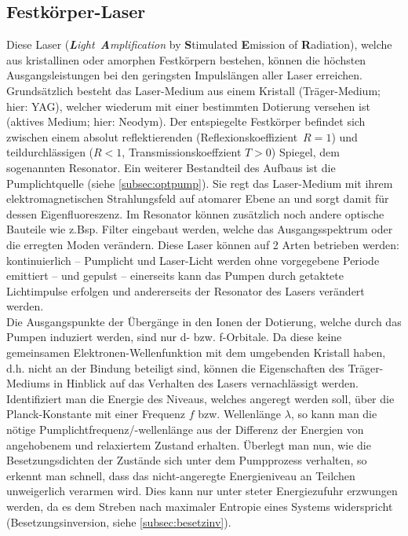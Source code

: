 \documentclass[numbers=noenddot,12pt,a4paper]{scrartcl}
\newcommand{\tilt}[1]{\mbox{\textit{#1}}}
\begin{document}
\subsection{Festkörper-Laser}\label{subsec:fklaser}
Diese Laser (\tilt{\textbf{L}ight \textbf{A}mplification} by \textbf{S}timulated \textbf{E}mission of \textbf{R}adiation), welche aus kristallinen oder amorphen Festkörpern bestehen, können die höchsten Ausgangsleistungen bei den geringsten Impulslängen aller Laser erreichen. Grundsätzlich besteht das Laser-Medium aus einem Kristall (Träger-Medium; hier: YAG), welcher wiederum mit einer bestimmten Dotierung versehen ist (aktives Medium; hier: Neodym). Der entspiegelte Festkörper befindet sich zwischen einem absolut reflektierenden \mbox{(Reflexionskoeffizient $R=1$)} und teildurchlässigen ($R<1$, Transmissionskoeffzient $T>0$) Spiegel, dem sogenannten Resonator. Ein weiterer Bestandteil des Aufbaus ist die Pumplichtquelle (siehe \ref{subsec:optpump}). Sie regt das Laser-Medium mit ihrem elektromagnetischen Strahlungsfeld auf atomarer Ebene an und sorgt damit für dessen Eigenfluoreszenz. Im Resonator können zusätzlich noch andere optische Bauteile wie z.Bsp. Filter eingebaut werden, welche das Ausgangsspektrum oder die erregten Moden verändern. Diese Laser können auf 2 Arten betrieben werden: kontinuierlich -- Pumplicht und Laser-Licht werden ohne vorgegebene Periode emittiert -- und gepulst -- einerseits kann das Pumpen durch getaktete Lichtimpulse erfolgen und andererseits der Resonator des Lasers verändert werden.\\ Die Ausgangspunkte der Übergänge in den Ionen der Dotierung, welche durch das Pumpen induziert werden, sind  nur d- bzw. f-Orbitale. Da diese keine gemeinsamen Elektronen-Wellenfunktion mit dem umgebenden Kristall haben, d.h. nicht an der Bindung beteiligt sind, können die Eigenschaften des Träger-Mediums in Hinblick auf das Verhalten des Lasers vernachlässigt werden.\\
Identifiziert man die Energie des Niveaus, welches angeregt werden soll, über die Planck-Konstante mit einer Frequenz $f$ bzw. Wellenlänge $\lambda$, so kann man die nötige Pumplichtfrequenz/-wellenlänge aus der Differenz der Energien von angehobenem und relaxiertem Zustand erhalten. Überlegt man nun, wie die Besetzungsdichten der Zustände sich unter dem Pumpprozess verhalten, so erkennt man schnell, dass das nicht-angeregte Energieniveau an Teilchen unweigerlich verarmen wird. Dies kann nur unter steter Energiezufuhr erzwungen werden, da es dem Streben nach maximaler Entropie eines Systems widerspricht (Besetzungsinversion, siehe \ref{subsec:besetzinv}).
\end{document}
